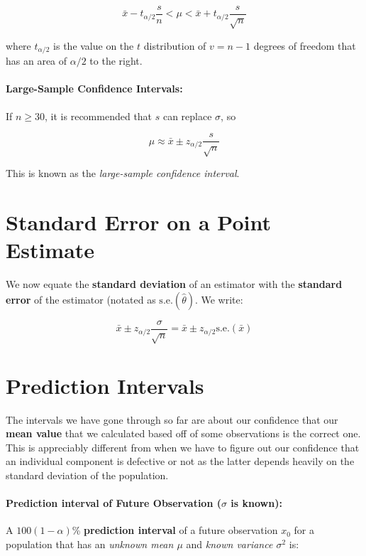 \documentclass[a4paper,12pt]{report}
\begin{document}
$$\bar{x} - t_{\alpha/2} \frac{s}{n} < \mu < \bar{x} + t_{\alpha/2}\frac{s}{\sqrt{n}}$$

where $t_{\alpha/2}$ is the value on the $t$ distribution of $v = n-1$ degrees of freedom that has an area of $\alpha/2$ to the right.

\paragraph{Large-Sample Confidence Intervals: } 

If $n \geq 30$, it is recommended that $s$ can replace $\sigma$, so 

$$\mu \approx \bar{x} \pm z_{\alpha/2}\frac{s}{\sqrt{n}}$$

This is known as the \textit{large-sample confidence interval}. 



\section{Standard Error on a Point Estimate}

We now equate the \textbf{standard deviation} of an estimator with the \textbf{standard error} of the estimator (notated as $\text{s.e.}(\hat{\theta})$. We write: 

$$\bar{x} \pm z_{\alpha/2}\frac{\sigma}{\sqrt{n}} = \bar{x} \pm z_{\alpha/2} \text{s.e.}(\bar{x})$$




\section{Prediction Intervals}

The intervals we have gone through so far are about our confidence that our \textbf{mean value} that we calculated based off of some observations is the correct one. This is appreciably different from when we have to figure out our confidence that an individual component is defective or not as the latter depends heavily on the standard deviation of the population.

\paragraph{Prediction interval of Future Observation ($\sigma$ is known): } A $100(1-\alpha)$\% \textbf{prediction interval} of a future observation $x_0$ for a population that has an \textit{unknown mean $\mu$} and \textit{known variance $\sigma^2$} is: 
\end{document}
